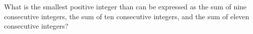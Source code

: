 What is the smallest positive integer than can be expressed as the sum of nine consecutive integers, the sum of ten consecutive integers, and the sum of eleven consecutive integers?